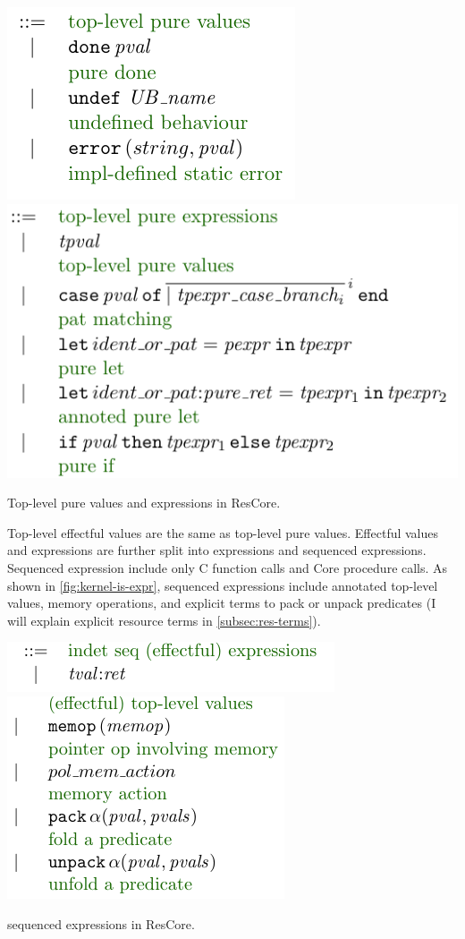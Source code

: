 \begin{marginfigure}
    \includegraphics{figures/kernel-tpval}
    \includegraphics{figures/kernel-tpexpr}
    \caption{Top-level pure values and expressions in ResCore.}\label{fig:kernel-tp}
\end{marginfigure}

Top-level effectful values are the same as top-level pure values.
Effectful values and expressions are further split into 
expressions and  sequenced expressions. Sequenced
expression include only C function calls and Core procedure calls.
As shown in \cref{fig:kernel-is-expr},  sequenced
expressions include annotated top-level values, memory operations, and explicit
terms to pack or unpack predicates (I will explain explicit resource terms in
\cref{subsec:res-terms}).

\begin{marginfigure}
    \includegraphics{figures/kernel-is-expr-1}
    \includegraphics{figures/kernel-is-expr-2}
    \caption{ sequenced expressions in ResCore.}\label{fig:kernel-is-expr}
\end{marginfigure}


